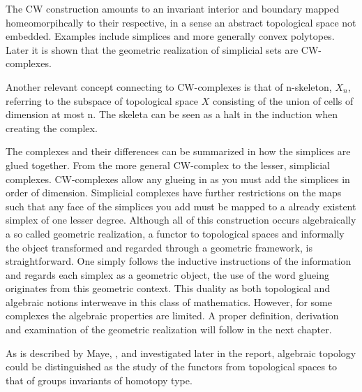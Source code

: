 \documentclass[../../main.tex]{subfiles}
\begin{document}
    The CW construction amounts to an invariant interior and boundary mapped homeomorpihcally to their respective, in a sense an abstract topological space not embedded. Examples include simplices and more generally convex polytopes. Later it is shown that the geometric realization of simplicial sets are CW-complexes.
    
    Another relevant concept connecting to CW-complexes is that of n-skeleton, $X_n$, referring to the subspace of topological space $X$ consisting of the union of cells of dimension at most n. The skeleta can be seen as a halt in the induction when creating the complex. 

    The complexes and their differences can be summarized in how the simplices are glued together. From the more general CW-complex to the lesser, simplicial complexes. CW-complexes allow any glueing in as you must add the simplices in order of dimension. Simplicial complexes have further restrictions on the maps such that any face of the simplices you add must be mapped to a already existent simplex of one lesser degree. Although all of this construction occurs algebraically a so called geometric realization, a functor to topological spaces and informally the object transformed and regarded through a geometric framework, is straightforward. One simply follows the inductive instructions of the information and regards each simplex as a geometric object, the use of the word glueing originates from this geometric context. This duality as both topological and algebraic notions interweave in this class of mathematics. However, for some complexes the algebraic properties are limited. A proper definition, derivation and examination of the geometric realization will follow in the next chapter.

    As is described by Maye, \cite{simp-maye}, and investigated later in the report, algebraic topology could be distinguished as the study of the functors from topological spaces to that of groups invariants of homotopy type. 

    
\end{document}
